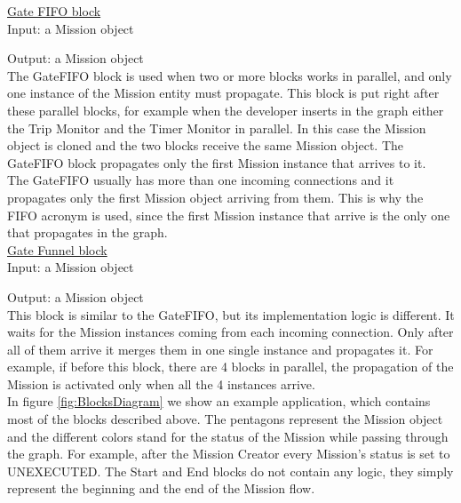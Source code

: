 \underline{Gate FIFO block}
\\

Input: a Mission object

Output: a Mission object
\\

The GateFIFO block is used when two or more blocks works in parallel, and only one instance of the Mission entity must propagate.
This block is put right after these parallel blocks, for example when the developer inserts in the graph either the Trip Monitor and the Timer Monitor in parallel. 
In this case the Mission object is cloned and the two blocks receive the same Mission object. 
The GateFIFO block propagates only the first Mission instance that arrives to it.
\\
The GateFIFO usually has more than one incoming connections and it propagates only the first Mission object arriving from them.
This is why the FIFO acronym is used, since the first Mission instance that arrive is the only one that propagates in the graph.
\\

\underline{Gate Funnel block}
\\

Input: a Mission object

Output: a Mission object
\\

This block is similar to the GateFIFO, but its implementation logic is different.
It waits for the Mission instances coming from each incoming connection.
Only after all of them arrive it merges them in one single instance and propagates it.
For example, if before this block, there are 4 blocks in parallel, the propagation of the Mission is activated only when all the 4 instances arrive.
\\

In figure \ref{fig:BlocksDiagram} we show an example application, which contains most of the blocks described above.
The pentagons represent the Mission object and the different colors stand for the status of the Mission while passing through the graph.
For example, after the Mission Creator every Mission's status is set to UNEXECUTED.
The Start and End blocks do not contain any logic, they simply represent the beginning and the end of the Mission flow.
\\

\newpage

